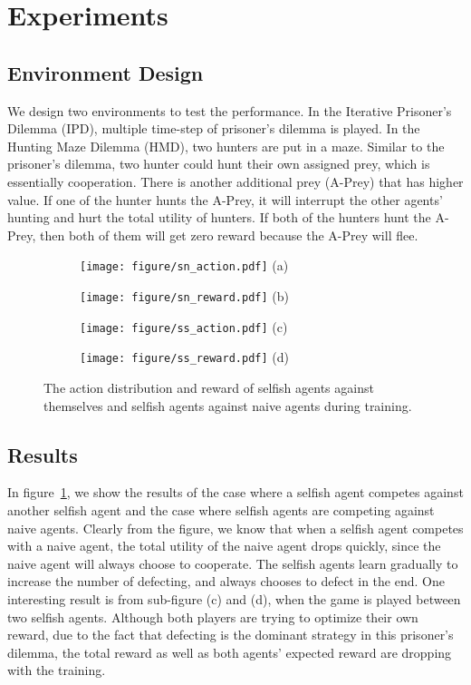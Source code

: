 \documentclass{article}
\begin{document}
\section{Experiments}
\subsection{Environment Design}
We design two environments to test the performance.
In the Iterative Prisoner's Dilemma (IPD), multiple time-step of prisoner's dilemma is played.
In the Hunting Maze Dilemma (HMD), two hunters are put in a maze.
Similar to the prisoner's dilemma, two hunter could hunt their own assigned prey, which is essentially cooperation.
There is another additional prey (A-Prey) that has higher value.
If one of the hunter hunts the A-Prey,
it will interrupt the other agents' hunting and hurt the total utility of hunters.
If both of the hunters hunt the A-Prey,
then both of them will get zero reward because the A-Prey will flee.
\begin{figure}
\begin{subfigure}{.24\textwidth}
\centering
\texttt{[image: figure/sn\_action.pdf]}
(a)
\end{subfigure}
\begin{subfigure}{.24\textwidth}
\centering
\texttt{[image: figure/sn\_reward.pdf]}
(b)
\end{subfigure}
\begin{subfigure}{.24\textwidth}
\centering
\texttt{[image: figure/ss\_action.pdf]}
(c)
\end{subfigure}
\begin{subfigure}{.24\textwidth}
\centering
\texttt{[image: figure/ss\_reward.pdf]}
(d)
\end{subfigure}
\caption{The action distribution and reward of selfish agents against themselves and selfish agents against naive agents during training.}
\label{fig:selfish}
\end{figure}

\subsection{Results}
In figure~\ref{fig:selfish},
we show the results of the case where a selfish agent competes against another selfish agent
and the case where selfish agents are competing against naive agents.
Clearly from the figure, we know that when a selfish agent competes with a naive agent,
the total utility of the naive agent drops quickly,
since the naive agent will always choose to cooperate.
The selfish agents learn gradually to increase the number of defecting,
and always chooses to defect in the end.
One interesting result is from sub-figure (c) and (d),
when the game is played between two selfish agents.
Although both players are trying to optimize their own reward,
due to the fact that defecting is the dominant strategy in this prisoner's dilemma,
the total reward as well as both agents' expected reward are dropping with the training.\\
\end{document}
